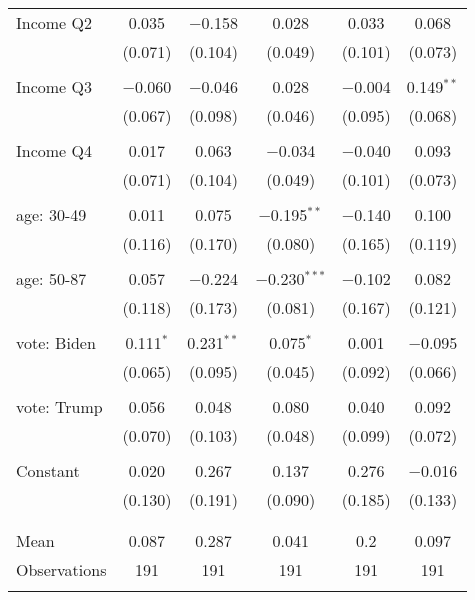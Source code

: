 \begin{tabular}{@{\extracolsep{5pt}}lccccc}
 Income Q2 & 0.035 & $-$0.158 & 0.028 & 0.033 & 0.068 \\ 
  & (0.071) & (0.104) & (0.049) & (0.101) & (0.073) \\ 
  & & & & & \\ 
 Income Q3 & $-$0.060 & $-$0.046 & 0.028 & $-$0.004 & 0.149$^{**}$ \\ 
  & (0.067) & (0.098) & (0.046) & (0.095) & (0.068) \\ 
  & & & & & \\ 
 Income Q4 & 0.017 & 0.063 & $-$0.034 & $-$0.040 & 0.093 \\ 
  & (0.071) & (0.104) & (0.049) & (0.101) & (0.073) \\ 
  & & & & & \\ 
 age: 30-49 & 0.011 & 0.075 & $-$0.195$^{**}$ & $-$0.140 & 0.100 \\ 
  & (0.116) & (0.170) & (0.080) & (0.165) & (0.119) \\ 
  & & & & & \\ 
 age: 50-87 & 0.057 & $-$0.224 & $-$0.230$^{***}$ & $-$0.102 & 0.082 \\ 
  & (0.118) & (0.173) & (0.081) & (0.167) & (0.121) \\ 
  & & & & & \\ 
 vote: Biden & 0.111$^{*}$ & 0.231$^{**}$ & 0.075$^{*}$ & 0.001 & $-$0.095 \\ 
  & (0.065) & (0.095) & (0.045) & (0.092) & (0.066) \\ 
  & & & & & \\ 
 vote: Trump & 0.056 & 0.048 & 0.080 & 0.040 & 0.092 \\ 
  & (0.070) & (0.103) & (0.048) & (0.099) & (0.072) \\ 
  & & & & & \\ 
 Constant & 0.020 & 0.267 & 0.137 & 0.276 & $-$0.016 \\ 
  & (0.130) & (0.191) & (0.090) & (0.185) & (0.133) \\ 
  & & & & & \\ 
\hline \\[-1.8ex] 
Mean & 0.087 & 0.287 & 0.041 & 0.2 & 0.097 \\ 
Observations & 191 & 191 & 191 & 191 & 191 \\ 
\hline 
\hline \\[-1.8ex] 
\end{tabular} 
